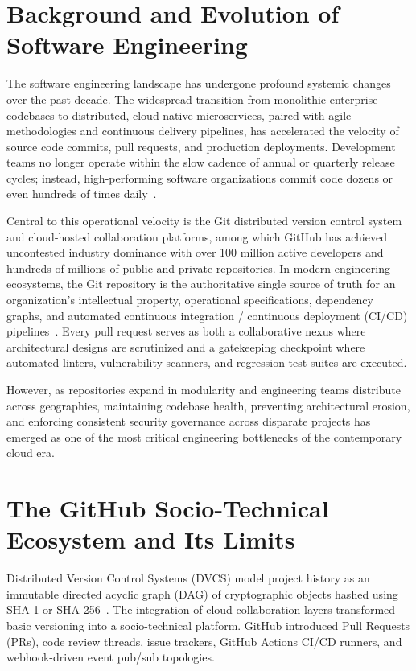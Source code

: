 \documentclass[12pt,a4paper,oneside]{report}
\begin{document}
\section{Background and Evolution of Software Engineering}
\label{sec:background}

The software engineering landscape has undergone profound systemic changes over the past decade. The widespread transition from monolithic enterprise codebases to distributed, cloud-native microservices, paired with agile methodologies and continuous delivery pipelines, has accelerated the velocity of source code commits, pull requests, and production deployments. Development teams no longer operate within the slow cadence of annual or quarterly release cycles; instead, high-performing software organizations commit code dozens or even hundreds of times daily~\cite{forsgren2018accelerate}. 

Central to this operational velocity is the Git distributed version control system~\cite{chacon2014pro} and cloud-hosted collaboration platforms, among which GitHub has achieved uncontested industry dominance with over 100 million active developers and hundreds of millions of public and private repositories. In modern engineering ecosystems, the Git repository is the authoritative single source of truth for an organization's intellectual property, operational specifications, dependency graphs, and automated continuous integration / continuous deployment (CI/CD) pipelines~\cite{humble2010continuous}. Every pull request serves as both a collaborative nexus where architectural designs are scrutinized and a gatekeeping checkpoint where automated linters, vulnerability scanners, and regression test suites are executed.

However, as repositories expand in modularity and engineering teams distribute across geographies, maintaining codebase health, preventing architectural erosion, and enforcing consistent security governance across disparate projects has emerged as one of the most critical engineering bottlenecks of the contemporary cloud era.

\section{The GitHub Socio-Technical Ecosystem and Its Limits}
\label{sec:github-limits}

Distributed Version Control Systems (DVCS) model project history as an immutable directed acyclic graph (DAG) of cryptographic objects hashed using SHA-1 or SHA-256~\cite{chacon2014pro}. The integration of cloud collaboration layers transformed basic versioning into a socio-technical platform. GitHub introduced Pull Requests (PRs), code review threads, issue trackers, GitHub Actions CI/CD runners, and webhook-driven event pub/sub topologies.
\end{document}
